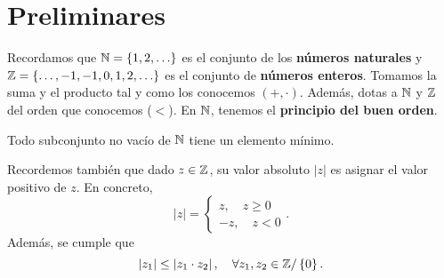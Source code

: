 \chapter{Preliminares}
Recordamos que $\displaystyle \mathbb{N} = \left\{ 1, 2, \ldots\right\} $ es el conjunto de los \textbf{números naturales} y $\displaystyle \mathbb{Z} = \left\{ \ldots, -1, -1, 0, 1, 2, \ldots\right\}  $ es el conjunto de \textbf{números enteros}. Tomamos la suma y el producto tal y como los conocemos $\displaystyle \left(+, \cdot \right) $. Además, dotas a $\displaystyle \mathbb{N} $ y $\displaystyle \mathbb{Z} $ del orden que conocemos ($\displaystyle < $). En $\displaystyle \mathbb{N} $, tenemos el \textbf{principio del buen orden}.
\begin{theorem}
Todo subconjunto no vacío de $\displaystyle \mathbb{N} $ tiene un elemento mínimo.
\end{theorem}
Recordemos también que dado $\displaystyle z \in \mathbb{Z} $, su valor absoluto $\displaystyle \left|z\right| $ es asignar el valor positivo de $\displaystyle z $. En concreto, 
\[ \left|z\right| =
\begin{cases}
z, \quad z \geq 0 \\
-z, \quad z < 0
\end{cases}
.\]
Además, se cumple que
\[ \left|z_{1}\right| \leq \left|z_{1} \cdot z_{2}\right|, \quad \forall z_{1}, z_{2} \in \mathbb{Z} / \left\{ 0\right\}  .\]
